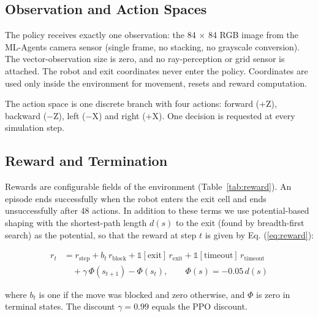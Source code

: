 \documentclass[conference]{IEEEtran}
\begin{document}
\subsection{Observation and Action Spaces}
The policy receives exactly one observation: the 84 $\times$ 84 RGB image from the ML-Agents camera sensor (single frame, no stacking, no grayscale conversion). The vector-observation size is zero, and no ray-perception or grid sensor is attached. The robot and exit coordinates never enter the policy. Coordinates are used only inside the environment for movement, resets and reward computation.

The action space is one discrete branch with four actions: forward (+Z), backward ($-$Z), left ($-$X) and right (+X). One decision is requested at every simulation step.


\subsection{Reward and Termination}
Rewards are configurable fields of the environment (Table~\ref{tab:reward}). An episode ends successfully when the robot enters the exit cell and ends unsuccessfully after 48 actions. In addition to these terms we use potential-based shaping \cite{ng1999shaping} with the shortest-path length $d(s)$ to the exit (found by breadth-first search) as the potential, so that the reward at step $t$ is given by Eq. (\ref{eq:reward}):

\begin{equation}
\label{eq:reward}
\begin{split}
r_t &= r_{\text{step}} + b_t\, r_{\text{block}} + \mathbb{1}[\text{exit}]\, r_{\text{exit}} + \mathbb{1}[\text{timeout}]\, r_{\text{timeout}} \\
&\quad + \gamma\,\Phi(s_{t+1}) - \Phi(s_t), \qquad \Phi(s) = -0.05\, d(s)
\end{split}
\end{equation}

where $b_t$ is one if the move was blocked and zero otherwise, and $\Phi$ is zero in terminal states. The discount $\gamma = 0.99$ equals the PPO discount.
\end{document}

